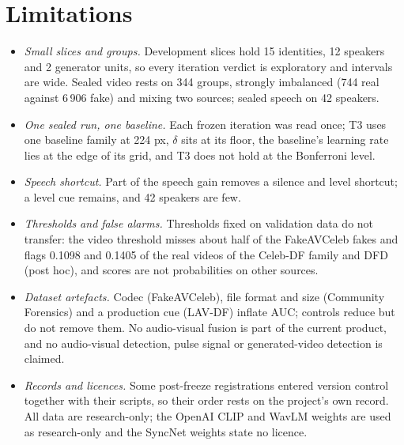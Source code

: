 \documentclass[conference,a4paper]{IEEEtran_nodash}
\begin{document}
\section{Limitations}\label{sec:discussion}
\begin{itemize}
  \item \emph{Small slices and groups.} Development slices hold 15 identities, 12
        speakers and 2 generator units, so every iteration verdict is exploratory
        and intervals are wide. Sealed video rests on 344 groups, strongly
        imbalanced (744 real against 6\,906 fake) and mixing two sources; sealed
        speech on 42 speakers.
  \item \emph{One sealed run, one baseline.} Each frozen iteration was read once; T3
        uses one baseline family at 224 px, $\delta$ sits at its floor, the
        baseline's learning rate lies at the edge of its grid, and T3 does not hold
        at the Bonferroni level.
  \item \emph{Speech shortcut.} Part of the speech gain removes a silence and level
        shortcut; a level cue remains, and 42 speakers are few.
  \item \emph{Thresholds and false alarms.} Thresholds fixed on validation data do
        not transfer: the video threshold misses about half of the FakeAVCeleb fakes
        and flags 0.1098 and 0.1405 of the real videos of the Celeb-DF family and
        DFD (post hoc), and scores are not probabilities on other sources.
  \item \emph{Dataset artefacts.} Codec (FakeAVCeleb), file format and size
        (Community Forensics) and a production cue (LAV-DF) inflate AUC; controls
        reduce but do not remove them. No audio-visual fusion is part of the current
        product, and no audio-visual detection, pulse signal or generated-video
        detection is claimed.
  \item \emph{Records and licences.} Some post-freeze registrations entered version
        control together with their scripts, so their order rests on the project's
        own record. All data are research-only; the OpenAI CLIP and WavLM weights
        are used as research-only and the SyncNet weights state no licence.
\end{itemize}

\end{document}
